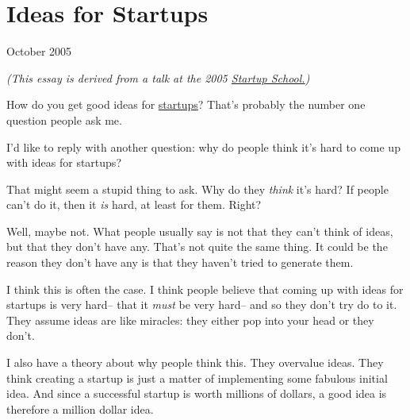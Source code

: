 \chapter{Ideas for Startups}


          
        
          


          
            
              
                


                  
                    October 2005

\emph{(This essay is derived from a talk at the 2005
                      \href{http://startupschool.org}{Startup School.})}

How do you get good ideas for
                    \href{http://www.paulgraham.com/start.html}{startups}? That's probably the
                    number one question people ask me.

I'd like to
                    reply with another question: why do people think it's hard
                    to come up with ideas for startups?

That might
                    seem a stupid thing to ask. Why do they \emph{think} it's
                    hard? If people can't do it, then it \emph{is} hard, at
                    least for them. Right?

Well, maybe not. What
                    people usually say is not that they can't think of ideas,
                    but that they don't have any. That's not quite the same
                    thing. It could be the reason they don't have any is that
                    they haven't tried to generate them.

I think this
                    is often the case. I think people believe that coming up
                    with ideas for startups is very hard-- that it
                    \emph{must} be very hard-- and so they don't try do to it.
                    They assume ideas are like miracles: they either pop into
                    your head or they don't.

I also have a theory
                    about why people think this. They overvalue ideas. They
                    think creating a startup is just a matter of implementing
                    some fabulous initial idea. And since a successful startup
                    is worth millions of dollars, a good idea is therefore a
                    million dollar idea.

